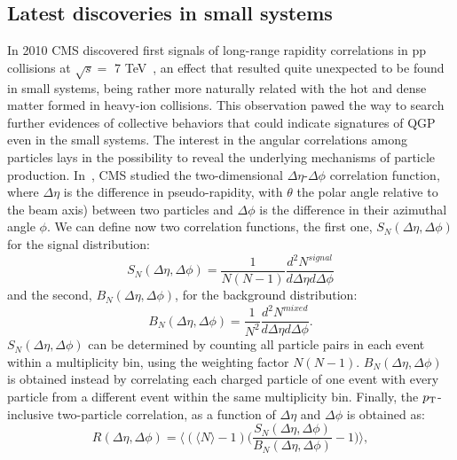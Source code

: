 \subsection{Latest discoveries in small systems}
In 2010 CMS discovered first signals of long-range rapidity correlations in pp collisions at $\sqrt{s} = $ 7 TeV~\cite{Khachatryan:2010gv}, an effect that resulted quite unexpected to be found in small systems, being rather more naturally related with the hot and dense matter formed in heavy-ion collisions. This observation pawed the way to search further evidences of collective behaviors that could indicate signatures of QGP even in the small systems. The interest in the angular correlations among particles lays in the possibility to reveal the underlying mechanisms of particle production. In~\cite{Khachatryan:2010gv}, CMS studied the two-dimensional $\Delta \eta$-$\Delta \phi$ correlation function, where $\Delta \eta$ is the difference in pseudo-rapidity, with $\theta$ the polar angle relative to the beam axis) between two particles and $\Delta \phi$ is the difference in their azimuthal angle $\phi$. We can define now two correlation functions, the first one, $S_N(\Delta \eta,\Delta \phi)$ for the signal distribution:
\begin{equation}
\label{SignalDistribution}
S_N(\Delta \eta,\Delta \phi) = \frac{1}{N(N-1)}\frac{d^2N^{signal}}{d\Delta \eta d\Delta \phi}
\end{equation}
and the second, $B_N(\Delta \eta,\Delta \phi)$, for the background distribution:
\begin{equation}
\label{BkgDistribution}
B_N(\Delta \eta,\Delta \phi) = \frac{1}{N^2}\frac{d^2N^{mixed}}{d\Delta \eta d\Delta \phi}.
\end{equation}
$S_N(\Delta \eta,\Delta \phi)$ can be determined by counting all particle pairs in each event within a multiplicity bin, using the weighting factor $N(N-1)$. $B_N(\Delta \eta,\Delta \phi)$ is obtained instead by correlating each charged particle of one event with every particle from a different event within the same multiplicity bin. Finally, the $p_{\rm T}$-inclusive two-particle correlation, as a function of $\Delta \eta$ and $\Delta \phi$ is obtained as:
\begin{equation}
\label{CorrelationFnc}
R(\Delta \eta,\Delta \phi) = \Big \langle (\langle N \rangle -1) \Big (\frac{S_N(\Delta \eta,\Delta \phi)}{B_N(\Delta \eta,\Delta \phi)} -1\Big )\Big \rangle,
\end{equation}
